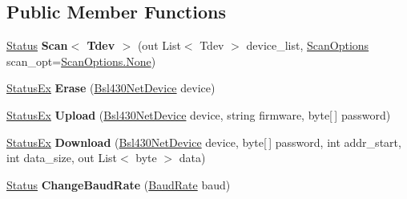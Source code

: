 \subsection*{Public Member Functions}
\begin{DoxyCompactItemize}
\item 
\mbox{\label{interface_b_s_l430___n_e_t_1_1_main_1_1_i_device_a88c853d21562c8f42e56d8c7e3c2bbbf}} 
\mbox{\hyperlink{class_b_s_l430___n_e_t_1_1_status}{Status}} {\bfseries Scan$<$ Tdev $>$} (out List$<$ Tdev $>$ device\+\_\+list, \mbox{\hyperlink{namespace_b_s_l430___n_e_t_a4cd6f8166a2a97ccb3405df2287d4ba8}{Scan\+Options}} scan\+\_\+opt=\mbox{\hyperlink{namespace_b_s_l430___n_e_t_a4cd6f8166a2a97ccb3405df2287d4ba8a6adf97f83acf6453d4a6a4b1070f3754}{Scan\+Options.\+None}})
\item 
\mbox{\label{interface_b_s_l430___n_e_t_1_1_main_1_1_i_device_ad1fbac2357d27956b3d2d833e67442cc}} 
\mbox{\hyperlink{class_b_s_l430___n_e_t_1_1_status_ex}{Status\+Ex}} {\bfseries Erase} (\mbox{\hyperlink{class_b_s_l430___n_e_t_1_1_bsl430_net_device}{Bsl430\+Net\+Device}} device)
\item 
\mbox{\label{interface_b_s_l430___n_e_t_1_1_main_1_1_i_device_ac1f8e78f926515b481aafaa24a9328cf}} 
\mbox{\hyperlink{class_b_s_l430___n_e_t_1_1_status_ex}{Status\+Ex}} {\bfseries Upload} (\mbox{\hyperlink{class_b_s_l430___n_e_t_1_1_bsl430_net_device}{Bsl430\+Net\+Device}} device, string firmware, byte\mbox{[}$\,$\mbox{]} password)
\item 
\mbox{\label{interface_b_s_l430___n_e_t_1_1_main_1_1_i_device_a6984bdc3d1635f42ea916479427006f5}} 
\mbox{\hyperlink{class_b_s_l430___n_e_t_1_1_status_ex}{Status\+Ex}} {\bfseries Download} (\mbox{\hyperlink{class_b_s_l430___n_e_t_1_1_bsl430_net_device}{Bsl430\+Net\+Device}} device, byte\mbox{[}$\,$\mbox{]} password, int addr\+\_\+start, int data\+\_\+size, out List$<$ byte $>$ data)
\item 
\mbox{\label{interface_b_s_l430___n_e_t_1_1_main_1_1_i_device_a344debe3e5cee19ae9e66adffec3df20}} 
\mbox{\hyperlink{class_b_s_l430___n_e_t_1_1_status}{Status}} {\bfseries Change\+Baud\+Rate} (\mbox{\hyperlink{namespace_b_s_l430___n_e_t_a8d30c263598635a481840944d38aeb70}{Baud\+Rate}} baud)

\end{DoxyCompactItemize}
